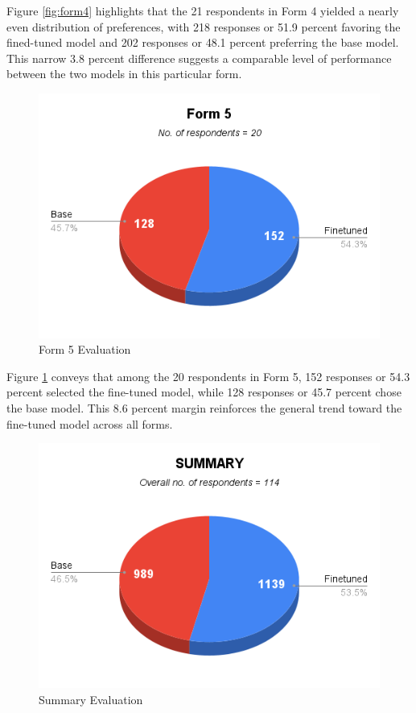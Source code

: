 Figure \ref{fig:form4} highlights that the 21 respondents in Form 4 yielded a nearly even distribution of preferences, with 218 responses or 51.9 percent favoring the fined-tuned model and 202 responses or 48.1 percent preferring the base model. This narrow 3.8 percent difference suggests a comparable level of performance between the two models in this particular form. 

\begin{figure}[htbp]
	\centering
	\includegraphics[scale=0.7]{figures/Form5.png}
	\caption{Form 5 Evaluation}
	\label{fig:form5}	
\end{figure}

Figure \ref{fig:form5} conveys that among the 20 respondents in Form 5, 152 responses or 54.3 percent selected the fine-tuned model, while 128 responses or 45.7 percent chose the base model. This 8.6 percent margin reinforces the general trend toward the fine-tuned model across all forms. 

\begin{figure}[htbp]
	\centering
	\includegraphics[scale=0.7]{figures/Summary.png}
	\caption{Summary Evaluation}
	\label{fig:summary}	
\end{figure}

